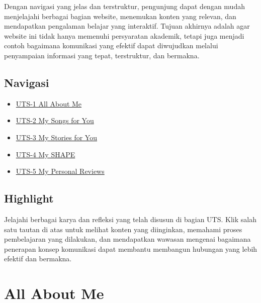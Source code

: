 \documentclass[
  letterpaper,
  DIV=11,
  numbers=noendperiod]{scrreprt}
\providecommand{\tightlist}{%
  \setlength{\itemsep}{0pt}\setlength{\parskip}{0pt}}
\begin{document}
Dengan navigasi yang jelas dan terstruktur, pengunjung dapat dengan
mudah menjelajahi berbagai bagian website, menemukan konten yang
relevan, dan mendapatkan pengalaman belajar yang interaktif. Tujuan
akhirnya adalah agar website ini tidak hanya memenuhi persyaratan
akademik, tetapi juga menjadi contoh bagaimana komunikasi yang efektif
dapat diwujudkan melalui penyampaian informasi yang tepat, terstruktur,
dan bermakna.

\section*{Navigasi}\label{navigasi}


\begin{itemize}
\tightlist
\item
  \href{https://lukmanhakimsa.github.io/all-about-me/All_About_me/\#awal-perjalanan}{UTS-1
  All About Me}\\
\item
  \href{./UTS-2-My-Songs-for-You.md}{UTS-2 My Songs for You}\\
\item
  \href{./UTS-3-My-Stories-for-You.md}{UTS-3 My Stories for You}\\
\item
  \href{./UTS-4-My-SHAPE.md}{UTS-4 My SHAPE}\\
\item
  \href{./UTS-5-My-Personal-Reviews.md}{UTS-5 My Personal Reviews}
\end{itemize}

\section*{Highlight}\label{highlight}


Jelajahi berbagai karya dan refleksi yang telah disusun di bagian UTS.
Klik salah satu tautan di atas untuk melihat konten yang diinginkan,
memahami proses pembelajaran yang dilakukan, dan mendapatkan wawasan
mengenai bagaimana penerapan konsep komunikasi dapat membantu membangun
hubungan yang lebih efektif dan bermakna.


\chapter{All About Me}\label{all-about-me}
\end{document}
